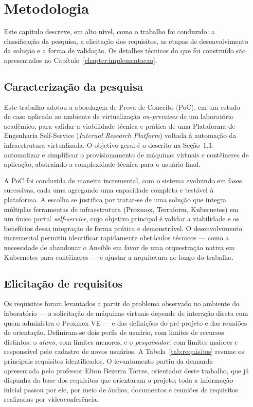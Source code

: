\chapter{Metodologia}
\label{chapter:metodologia}

Este capítulo descreve, em alto nível, como o trabalho foi conduzido: a classificação da pesquisa, a elicitação dos requisitos, as etapas de desenvolvimento da solução e a forma de validação. Os detalhes técnicos do que foi construído são apresentados no Capítulo~\ref{chapter:implementacao}.

\section{Caracterização da pesquisa}

Este trabalho adotou a abordagem de Prova de Conceito (PoC), em um estudo de caso aplicado ao ambiente de virtualização \textit{on-premises} de um laboratório acadêmico, para validar a viabilidade técnica e prática de uma Plataforma de Engenharia Self-Service (\textit{Internal Research Platform}) voltada à automação da infraestrutura virtualizada. O objetivo geral é o descrito na Seção~1.1: automatizar e simplificar o provisionamento de máquinas virtuais e contêineres de aplicação, abstraindo a complexidade técnica para o usuário final.\\
\par A PoC foi conduzida de maneira incremental, com o sistema evoluindo em fases sucessivas, cada uma agregando uma capacidade completa e testável à plataforma. A escolha se justifica por tratar-se de uma solução que integra múltiplas ferramentas de infraestrutura (Proxmox, Terraform, Kubernetes) em um único portal \textit{self-service}, cujo objetivo principal é validar a viabilidade e os benefícios dessa integração de forma prática e demonstrável. O desenvolvimento incremental permitiu identificar rapidamente obstáculos técnicos — como a necessidade de abandonar o Ansible em favor de uma orquestração nativa em Kubernetes para contêineres — e ajustar a arquitetura ao longo do trabalho.

\section{Elicitação de requisitos}
\label{sec:elicitacao}

Os requisitos foram levantados a partir do problema observado no ambiente do laboratório — a solicitação de máquinas virtuais depende de interação direta com quem administra o Proxmox VE — e das definições do pré-projeto e das reuniões de orientação. Definiram-se dois perfis de usuário, com limites de recursos distintos: o \textit{aluno}, com limites menores, e o \textit{pesquisador}, com limites maiores e responsável pelo cadastro de novos usuários. A Tabela~\ref{tab:requisitos} resume os principais requisitos identificados. O levantamento partiu da demanda apresentada pelo professor Elton Bezerra Torres, orientador deste trabalho, que já dispunha da base dos requisitos que orientaram o projeto; toda a informação inicial passou por ele, por meio de áudios, documentos e reuniões de requisitos realizadas por videoconferência.

